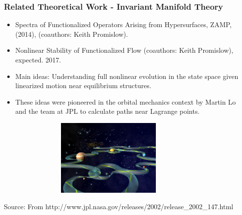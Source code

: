 \documentclass[mathserif]{beamer}
\begin{document}
\begin{frame}
\frametitle{Related Theoretical Work - Invariant Manifold Theory}

\begin{itemize}
\item Spectra of Functionalized Operators Arising from Hypersurfaces, ZAMP, (2014),
(coauthors: Keith Promislow).

\item Nonlinear Stability of Functionalized Flow  (coauthors: Keith Promislow), expected. 2017.

\item Main ideas:  Understanding full nonlinear evolution in the state space given linearized motion near equilibrium structures.

\item These ideas were pioneered in the orbital mechanics context by Martin Lo and the team at JPL to calculate paths near Lagrange points.
\end{itemize}

\includegraphics[height=1.5in, width=4.5in]{ish.jpg}

\tiny{Source: From http://www.jpl.nasa.gov/releases/2002/release\_2002\_147.html}

\end{frame}
\end{document}
